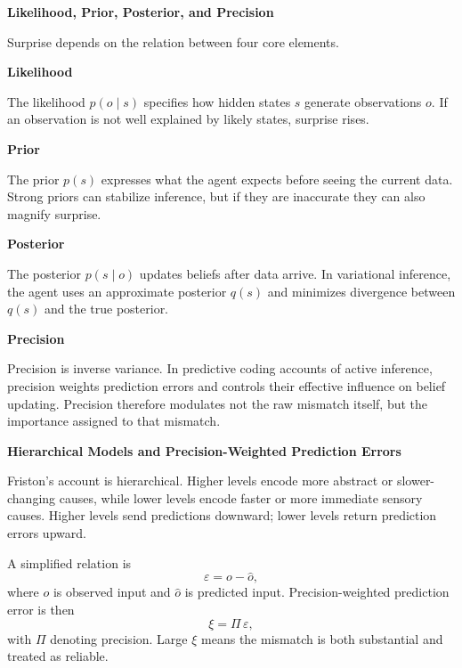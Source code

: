 \documentclass{book}
\providecommand{\ProjectDeepHeading}[2]{%
    \par\medskip\noindent\textbf{#2}\par\smallskip
}
\begin{document}
    
    \ProjectDeepHeading{11}{Likelihood, Prior, Posterior, and Precision}
        Surprise depends on the relation between four core elements.
        
        \ProjectDeepHeading{12}{Likelihood}
            The likelihood $p(o \mid s)$ specifies how hidden states $s$ generate observations $o$. If an observation is not well explained by likely states, surprise rises.
        
        \ProjectDeepHeading{12}{Prior}
            The prior $p(s)$ expresses what the agent expects before seeing the current data. Strong priors can stabilize inference, but if they are inaccurate they can also magnify surprise.
        
        \ProjectDeepHeading{12}{Posterior}
            The posterior $p(s \mid o)$ updates beliefs after data arrive. In variational inference, the agent uses an approximate posterior $q(s)$ and minimizes divergence between $q(s)$ and the true posterior.
        
        \ProjectDeepHeading{12}{Precision}
            Precision is inverse variance. In predictive coding accounts of active inference, precision weights prediction errors and controls their effective influence on belief updating. Precision therefore modulates not the raw mismatch itself, but the importance assigned to that mismatch.
    
    
    \ProjectDeepHeading{11}{Hierarchical Models and Precision-Weighted Prediction Errors}
        Friston's account is hierarchical. Higher levels encode more abstract or slower-changing causes, while lower levels encode faster or more immediate sensory causes. Higher levels send predictions downward; lower levels return prediction errors upward.
        
        A simplified relation is
        \begin{equation}
            \ensuremath{\varepsilon} = o - \hat{o},
        \end{equation}
        where $o$ is observed input and $\hat{o}$ is predicted input. Precision-weighted prediction error is then
        \begin{equation}
            \ensuremath{\xi} = \ensuremath{\Pi} \, \ensuremath{\varepsilon},
        \end{equation}
        with $\ensuremath{\Pi}$ denoting precision. Large $\ensuremath{\xi}$ means the mismatch is both substantial and treated as reliable.
        
        \begin{center}
        \end{center}
    
\end{document}
